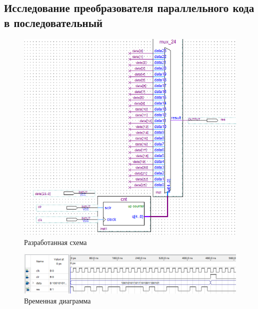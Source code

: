 \documentclass[a4paper,12pt]{article}
\begin{document}
    \subsection{Исследование преобразователя параллельного кода в последовательный}
    \begin{figure}[H]
        \centering
        \includegraphics[width=\linewidth]{scheme_code}
        \caption{Разработанная схема}
    \end{figure}
    \begin{figure}[H]
        \centering
        \includegraphics[width=\linewidth]{wave_code}
        \caption{Временная диаграмма}
    \end{figure}
\end{document}
